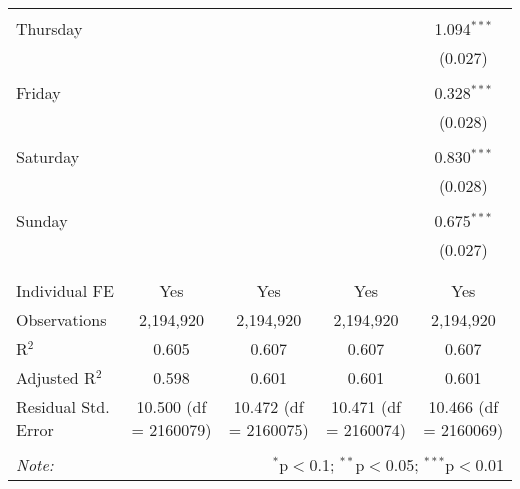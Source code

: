 \documentclass[
]{article}
\begin{document}
\begin{table}[!htbp]
{\begin{tabular}{@{\extracolsep{5pt}}lcccc}
  & & & & \\ 
 Thursday &  &  &  & 1.094$^{***}$ \\ 
  &  &  &  & (0.027) \\ 
  & & & & \\ 
 Friday &  &  &  & 0.328$^{***}$ \\ 
  &  &  &  & (0.028) \\ 
  & & & & \\ 
 Saturday &  &  &  & 0.830$^{***}$ \\ 
  &  &  &  & (0.028) \\ 
  & & & & \\ 
 Sunday &  &  &  & 0.675$^{***}$ \\ 
  &  &  &  & (0.027) \\ 
  & & & & \\ 
\hline \\[-1.8ex] 
Individual FE & Yes & Yes & Yes & Yes \\ 
Observations & 2,194,920 & 2,194,920 & 2,194,920 & 2,194,920 \\ 
R$^{2}$ & 0.605 & 0.607 & 0.607 & 0.607 \\ 
Adjusted R$^{2}$ & 0.598 & 0.601 & 0.601 & 0.601 \\ 
Residual Std. Error & 10.500 (df = 2160079) & 10.472 (df = 2160075) & 10.471 (df = 2160074) & 10.466 (df = 2160069) \\ 
\hline 
\hline \\[-1.8ex] 
\textit{Note:}  & \multicolumn{4}{r}{$^{*}$p$<$0.1; $^{**}$p$<$0.05; $^{***}$p$<$0.01} \\ 
\end{tabular}
} 
\end{table} 
\newpage
\end{document}
